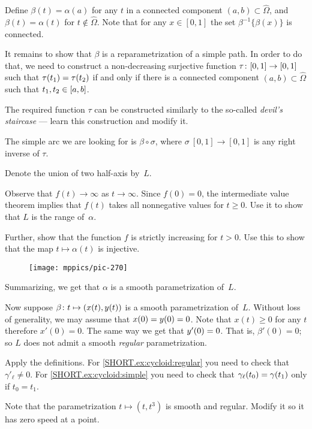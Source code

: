 \begin{multicols}{2}
Define $\beta(t)=\alpha(a)$ for any $t$ in a connected component $(a,b)\subset\hat \Omega$, and $\beta (t) = \alpha (t) $ for $t\notin\hat{\Omega}$.
Note that for any $x\in [0,1]$ the set $\beta^{-1}\{\beta(x)\}$ is connected.

It remains to show that $\beta$ is a reparametrization of a simple path.
In order to do that, we need to construct a non-decreasing surjective function $\tau\:[0,1]\z\to[0,1]$ such that 
$\tau(t_1)\z=\tau(t_2)$ if and only if there is a connected component $(a,b)\subset\hat \Omega$ such that $t_1,t_2\z\in [a,b]$.

The required function $\tau$ can be constructed similarly to the so-called {}\emph{devil's staircase} --- learn this construction and modify it.

The simple arc we are looking for is $\beta \circ \sigma$, where $\sigma\: [0,1]\to [0,1]$ is any right inverse of $\tau$.

Denote the union of two half-axis by~$L$.

Observe that $f(t)\to\infty$ as $t\to \infty$.
Since $f(0)=0$, the intermediate value theorem implies that $f(t)$ takes all nonnegative values for $t\ge 0$.
Use it to show that $L$ is the range of~$\alpha$.

Further, show that the function $f$ is strictly increasing for $t> 0$.
Use this to show that the map $t\mapsto \alpha(t)$ is injective.

\begin{wrapfigure}{r}{20 mm}
\vskip-7mm
\centering
\texttt{[image: mppics/pic-270]}
\vskip0mm
\end{wrapfigure}

Summarizing, we get that $\alpha$ is a smooth parametrization of~$L$. 

Now suppose $\beta\:t\z\mapsto (x(t),y(t))$ is a smooth parametrization of~$L$.
Without loss of generality, we may assume that $x(0)\z=y(0)=0$.
Note that $x(t)\ge 0$ for any $t$ therefore $x'(0)=0$.
The same way we get that $y'(0)\z=0$.
That is, $\beta'(0)=0$;
so $L$ does not admit a smooth \textit{regular} parametrization.

Apply the definitions.
For \ref{SHORT.ex:cycloid:regular} you need to check that $\gamma'_\ell\ne 0$.
For \ref{SHORT.ex:cycloid:simple} you need to check that $\gamma_\ell(t_0)\z=\gamma(t_1)$ only if $t_0=t_1$.

Note that the parametrization $t\mapsto (t,t^3)$ is smooth and regular.
Modify it so it has zero speed at a point.


\end{multicols}
